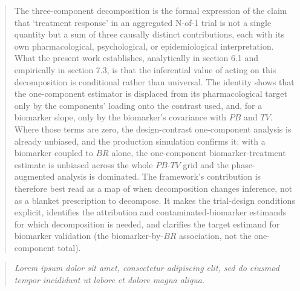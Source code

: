 \documentclass[
  11pt,
]{article}
\newenvironment{rgt}{%
  \begin{quote}\small\itshape\color[RGB]{20,60,160}}{%
  \end{quote}}
\newenvironment{orig}{%
  \begin{quote}\normalsize\color[gray]{0.55}}{%
  \end{quote}}
\begin{document}
\begin{orig}
The three-component decomposition is the formal expression of
the claim that `treatment response' in an aggregated N-of-1
trial is not a single quantity but a sum of three causally
distinct contributions, each with its own pharmacological,
psychological, or epidemiological interpretation. What the present
work establishes, analytically in section 6.1 and empirically in
section 7.3, is that the inferential value of acting on this
decomposition is conditional rather than universal. The identity
shows that the one-component estimator is displaced from its
pharmacological target only by the components' loading onto the
contrast used, and, for a biomarker slope, only by the biomarker's
covariance with \(PB\) and \(TV\). Where those terms are zero, the
design-contrast one-component analysis is already unbiased, and the
production simulation confirms it: with a biomarker coupled to \(BR\)
alone, the one-component biomarker-treatment estimate is
unbiased across the whole \(PB\)-\(TV\) grid and the phase-augmented
analysis is dominated. The framework's contribution is therefore
best read as a map of when decomposition changes inference, not as
a blanket prescription to decompose. It makes the trial-design
conditions explicit, identifies the attribution and
contaminated-biomarker estimands for which decomposition is needed,
and clarifies the target estimand for biomarker validation (the
biomarker-by-\(BR\) association, not the one-component total).

\end{orig}

\begin{rgt}
Lorem ipsum dolor sit amet, consectetur adipiscing elit, sed do eiusmod tempor incididunt ut labore et dolore magna aliqua.

\end{rgt}
\end{document}
